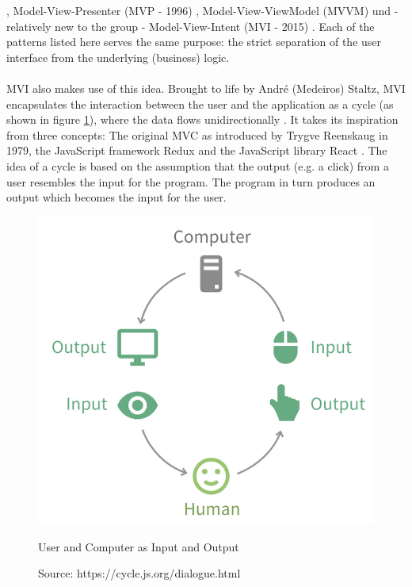 \cite{theModelViewEditorTrygveReenskaug1979,modelsViewsControllersTrygveReenskaug1979,aDescriptionOfTheModelViewControllerGlennE1988,professionalASPNETMVC52014}, 
Model-View-Presenter (MVP - 1996) 
\cite{mVPModelViewPresenterTheTaligentMikePotel1996,modelViewPresenterMartinFowler2006,proAspNetMVC3FrameworkModelViewPresenter2011},
Model-View-ViewModel (MVVM) 
\cite{introductionToModelViewModelPatternJohnGossman2005, modelViewViewModelDesignPatternUsingWindowsErikSorenson2010,proAspNetMVC3FrameworkModelViewPresenter2011}
und - relatively new to the group - Model-View-Intent (MVI - 2015) 
\cite{whatIfTheUserWasAFunctionYoutubeAndreStaltzUserFunction2015,reactiveProgrammingWithRxJSMVISergiMansilla,modelViewIntentOnAndroidHannesDorfmann2016}. 
Each of the patterns listed here serves the same purpose: the strict separation of the user interface from the underlying (business) logic.
\\
\\
MVI also makes use of this idea. Brought to life by André (Medeiros) Staltz, MVI encapsulates the interaction between the user and the application as a cycle 
(as shown in figure 
\ref{fig:userComputerInputOutput}), 
where the data flows unidirectionally 
\cite{unidirectionalDataFlowFluxArchitectureIlyGelman2017,unidirectionalDataFlowTamingTheStateinReactRobinWieruch2018,unidirectionalDataFlowTheCompleteReduxBookIlyGelman2017}.
It takes its inspiration from three concepts: The original MVC as introduced by Trygve Reenskaug in 1979, the JavaScript framework Redux 
\cite{reduxReduxQuickStartGuidJamesLee2019} 
and the JavaScript library React 
\cite{reactJSReactJsAnOpenSourceNaimulIslamNaim2017}. 
The idea of a cycle is based on the assumption that the output (e.g. a click) from a user resembles the input for the program. The program in turn produces an output 
which becomes the input for the user.
\begin{figure}[ht]
    \centering
    \includegraphics[height=0.5\textwidth]{./images/mvi-cycle}
    \caption{User and Computer as Input and Output}
    \caption*{Source: https://cycle.js.org/dialogue.html}
    \label{fig:userComputerInputOutput}
\end{figure}
